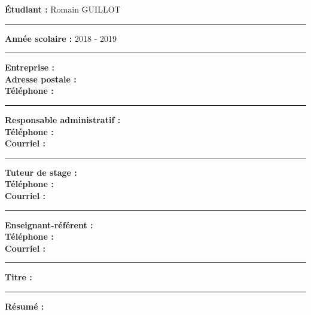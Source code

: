 
\clearpage \ifodd\value{page}\hbox{\thispagestyle{empty}}\newpage\fi
\thispagestyle{empty}

\noindent\textbf{Étudiant :} Romain GUILLOT

\noindent\rule{\textwidth}{1pt}

\noindent\textbf{Année scolaire :} 2018 - 2019

\noindent\rule{\textwidth}{1pt}

\noindent\textbf{Entreprise :} \\
\noindent\textbf{Adresse postale :} \\
\noindent\textbf{Téléphone :}

\noindent\rule{\textwidth}{1pt}

\noindent\textbf{Responsable administratif :} \\
\noindent\textbf{Téléphone :} \\
\noindent\textbf{Courriel :}

\noindent\rule{\textwidth}{1pt}

\noindent\textbf{Tuteur de stage :} \\
\noindent\textbf{Téléphone :} \\
\noindent\textbf{Courriel :}

\noindent\rule{\textwidth}{1pt}

\noindent\textbf{Enseignant-référent :} \\
\noindent\textbf{Téléphone :} \\
\noindent\textbf{Courriel :}

\noindent\rule{\textwidth}{1pt}

\noindent\textbf{Titre :}

\noindent\rule{\textwidth}{1pt}

\noindent\textbf{Résumé :}
